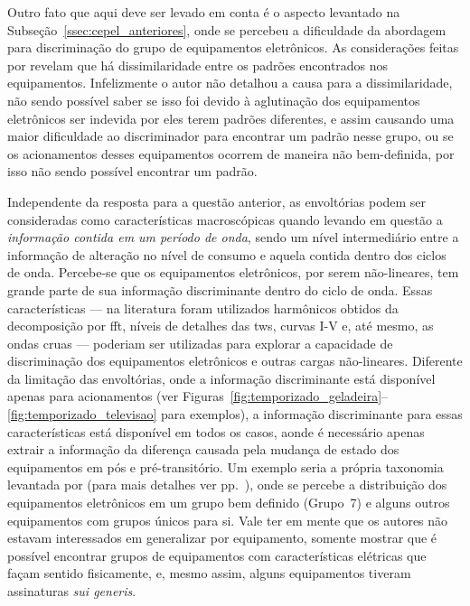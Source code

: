 Outro fato que aqui deve ser levado em conta é o aspecto levantado na
Subseção~\ref{ssec:cepel_anteriores}, onde se percebeu a dificuldade
da abordagem para discriminação do grupo de equipamentos eletrônicos.  As
considerações feitas por \citeauthor*{nilm_cepel_alvaro} revelam que
há dissimilaridade entre os padrões encontrados nos equipamentos.
Infelizmente o autor não detalhou a causa para a dissimilaridade, não
sendo possível saber se isso foi devido à aglutinação dos equipamentos
eletrônicos ser indevida por eles terem padrões diferentes,
e assim causando uma maior dificuldade ao discriminador para encontrar
um padrão nesse grupo, ou se os acionamentos desses equipamentos ocorrem
de maneira não bem-definida, por isso não sendo possível encontrar um
padrão.

Independente da resposta para a questão anterior, as envoltórias podem
ser consideradas como características macroscópicas quando levando em
questão a \emph{informação contida em um período de onda}, sendo um nível
intermediário entre a informação de alteração no nível de consumo e
aquela contida dentro dos ciclos de onda. Percebe-se que os equipamentos
eletrônicos, por serem não-lineares, tem grande parte de sua
informação discriminante dentro do ciclo de onda. Essas
características --- na literatura foram utilizados harmônicos obtidos da
decomposição por \gls{fft}, níveis de detalhes das \glspl{tw}, curvas
I-V e, até mesmo, as ondas cruas --- poderiam ser utilizadas para
explorar a capacidade de discriminação dos equipamentos eletrônicos e
outras cargas não-lineares. Diferente da limitação das envoltórias,
onde a informação discriminante está disponível apenas para
acionamentos (ver
Figuras~\ref{fig:temporizado_geladeira}--\ref{fig:temporizado_televisao} para
exemplos),
a informação discriminante para essas características
está disponível em todos os casos, aonde é
necessário apenas extrair a informação da diferença causada pela
mudança de estado dos equipamentos em pós e pré-transitório. Um exemplo
seria a própria taxonomia levantada por \citet{nilm_lam_2007_33} (para
mais detalhes ver pp.~\pageref{nilm:curvas_iv}), onde se percebe a
distribuição dos equipamentos eletrônicos em um grupo bem definido
(Grupo~7) e alguns outros equipamentos com grupos únicos para si. Vale
ter em mente que os autores não estavam interessados em generalizar
por equipamento, somente mostrar que é possível encontrar grupos de
equipamentos com características elétricas que façam sentido fisicamente,
e, mesmo assim, alguns equipamentos tiveram assinaturas \emph{sui
generis}.

